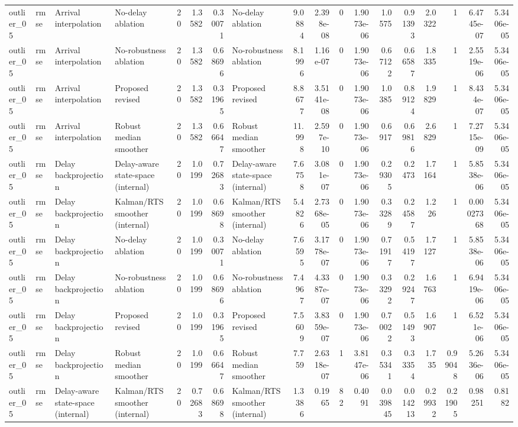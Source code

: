 \begin{table}[!htbp]
{\begin{tabular}{llllrrrlrrrrrrrrrr}
outlier_05 & rmse & Arrival interpolation & No-delay ablation & 20 & 1.3582 & 0.30071 & No-delay ablation & 9.0884 & 2.398e-08 & 0 & 1.9073e-06 & 1.0575 & 0.91393 & 2.0322 & 1 & 6.4745e-07 & 5.3406e-05 \\
outlier_05 & rmse & Arrival interpolation & No-robustness ablation & 20 & 1.3582 & 0.68696 & No-robustness ablation & 8.1996 & 1.16e-07 & 0 & 1.9073e-06 & 0.67122 & 0.66587 & 1.8335 & 1 & 2.5519e-06 & 5.3406e-05 \\
outlier_05 & rmse & Arrival interpolation & Proposed revised & 20 & 1.3582 & 0.31965 & Proposed revised & 8.8677 & 3.5141e-08 & 0 & 1.9073e-06 & 1.0385 & 0.89124 & 1.9829 & 1 & 8.434e-07 & 5.3406e-05 \\
outlier_05 & rmse & Arrival interpolation & Robust median smoother & 20 & 1.3582 & 0.66647 & Robust median smoother & 11.998 & 2.597e-10 & 0 & 1.9073e-06 & 0.6917 & 0.69816 & 2.6829 & 1 & 7.2715e-09 & 5.3406e-05 \\
outlier_05 & rmse & Delay backprojection & Delay-aware state-space (internal) & 20 & 1.0199 & 0.72683 & Delay-aware state-space (internal) & 7.6758 & 3.081e-07 & 0 & 1.9073e-06 & 0.29305 & 0.2473 & 1.7164 & 1 & 5.8538e-06 & 5.3406e-05 \\
outlier_05 & rmse & Delay backprojection & Kalman/RTS smoother (internal) & 20 & 1.0199 & 0.68698 & Kalman/RTS smoother (internal) & 5.4826 & 2.7368e-05 & 0 & 1.9073e-06 & 0.33289 & 0.24587 & 1.226 & 1 & 0.00027368 & 5.3406e-05 \\
outlier_05 & rmse & Delay backprojection & No-delay ablation & 20 & 1.0199 & 0.30071 & No-delay ablation & 7.6595 & 3.1778e-07 & 0 & 1.9073e-06 & 0.71917 & 0.54197 & 1.7127 & 1 & 5.8538e-06 & 5.3406e-05 \\
outlier_05 & rmse & Delay backprojection & No-robustness ablation & 20 & 1.0199 & 0.68696 & No-robustness ablation & 7.4967 & 4.3387e-07 & 0 & 1.9073e-06 & 0.33292 & 0.29247 & 1.6763 & 1 & 6.9419e-06 & 5.3406e-05 \\
outlier_05 & rmse & Delay backprojection & Proposed revised & 20 & 1.0199 & 0.31965 & Proposed revised & 7.5609 & 3.8359e-07 & 0 & 1.9073e-06 & 0.70022 & 0.51493 & 1.6907 & 1 & 6.521e-06 & 5.3406e-05 \\
outlier_05 & rmse & Delay backprojection & Robust median smoother & 20 & 1.0199 & 0.66647 & Robust median smoother & 7.759 & 2.6318e-07 & 1 & 3.8147e-06 & 0.35341 & 0.33354 & 1.735 & 0.99048 & 5.2636e-06 & 5.3406e-05 \\
outlier_05 & rmse & Delay-aware state-space (internal) & Kalman/RTS smoother (internal) & 20 & 0.72683 & 0.68698 & Kalman/RTS smoother (internal) & 1.3386 & 0.1965 & 82 & 0.4091 & 0.039845 & 0.014213 & 0.29932 & 0.21905 & 0.98251 & 0.8182 \\

\end{tabular}}
\end{table}
